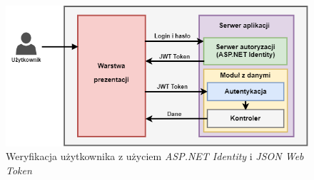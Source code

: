     
    \begin{figure}[ht]
	\centering
	\includegraphics[width=1\linewidth]{graphics/chapter-3/jwt-identity-diagram.png}
	\caption{Weryfikacja użytkownika z użyciem \textit{ASP.NET Identity} i \textit{JSON Web Token}}
	\label{fig:jwt-identity-diagram}
    \end{figure}




